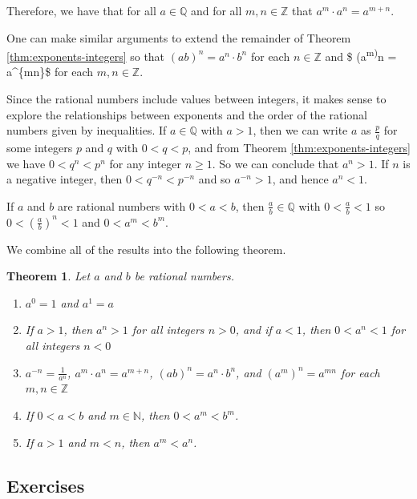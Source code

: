 \documentclass[
]{book}
\newtheorem{theorem}{Theorem}[chapter]
\theoremstyle{definition}
\theoremstyle{definition}
\theoremstyle{definition}
\theoremstyle{remark}
\begin{document}
Therefore, we have that for all \(a\in \mathbb{Q}\) and for all \(m,n\in \mathbb{Z}\) that \(a^m\cdot a^n = a^{m+n}\).

One can make similar arguments to extend the remainder of Theorem \ref{thm:exponents-integers} so that \((ab)^n=a^n\cdot b^n\) for each \(n\in \mathbb{Z}\) and \$ (a\textsuperscript{m)}n = a\^{}\{mn\}\$ for each \(m,n\in \mathbb{Z}\).

Since the rational numbers include values between integers, it makes sense to explore the relationships between exponents and the order of the rational numbers given by inequalities. If \(a\in \mathbb{Q}\) with \(a>1\), then we can write \(a\) as \(\frac{p}{q}\) for some integers \(p\) and \(q\) with \(0<q<p\), and from Theorem \ref{thm:exponents-integers} we have \(0<q^n<p^n\) for any integer \(n\geq 1\). So we can conclude that \(a^n>1\). If \(n\) is a negative integer, then \(0<q^{-n}<p^{-n}\) and so \(a^{-n} >1\), and hence \(a^n<1\).

If \(a\) and \(b\) are rational numbers with \(0<a<b\), then \(\frac{a}{b}\in \mathbb{Q}\) with \(0<\frac{a}{b}<1\) so \(0<\left(\frac{a}{b}\right)^n<1\) and \(0<a^m<b^m\).

We combine all of the results into the following theorem.

\begin{theorem}
\protect\hypertarget{thm:exponents-rationals}{}{\label{thm:exponents-rationals} }Let \(a\) and \(b\) be rational numbers.

\begin{enumerate}
\def\labelenumi{\arabic{enumi}.}
\item
  \(a^0=1\) and \(a^1=a\)
\item
  If \(a>1\), then \(a^n >1\) for all integers \(n>0\), and if \(a<1\), then \(0<a^n<1\) for all integers \(n<0\)
\item
  \(a^{-n} = \frac{1}{a^n}\), \(a^m\cdot a^n = a^{m+n}\), \((ab)^n=a^n\cdot b^n\), and \((a^m)^n = a^{mn}\) for each \(m,n\in \mathbb{Z}\)
\item
  If \(0<a<b\) and \(m\in \mathbb{N}\), then \(0<a^m<b^m\).
\item
  If \(a>1\) and \(m<n\), then \(a^m<a^n\).
\end{enumerate}
\end{theorem}

\hypertarget{exercises-12}{%
\subsection{Exercises}\label{exercises-12}}
\end{document}
